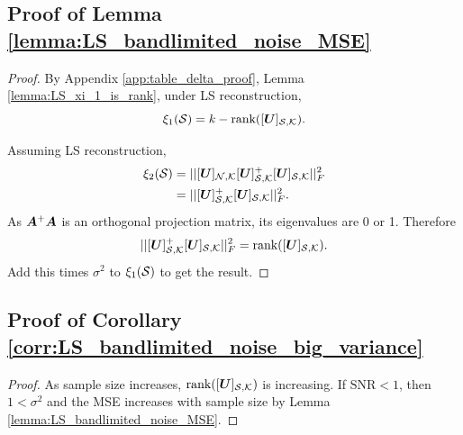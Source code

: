 \subsection{Proof of Lemma \ref{lemma:LS_bandlimited_noise_MSE}}
\begin{proof}
By Appendix \ref{app:table_delta_proof}, Lemma \ref{lemma:LS_xi_1_is_rank}, under LS reconstruction,
    \begin{equation}
    \xi_{1}(\mathcal{S}) = k - \textrm{rank}([\bm{U}]_{\mathcal{S},\mathcal{K}}).
    \end{equation}

    Assuming LS reconstruction,
    \begin{align}
         \xi_{2}(\set{S}) &=  || \matrsubU{N}[\matr{U}]_{\set{S},\set{K}}^{+}[\matr{U}]_{\set{S},\set{K}}||^{2}_{F} \\
         &= || [\matr{U}]_{\set{S},\set{K}}^{+}[\matr{U}]_{\set{S},\set{K}}||^{2}_{F}.
    \end{align}
    As $\bm{A}^{+}\bm{A}$ is an orthogonal projection matrix, its eigenvalues are 0 or 1. Therefore
    \begin{equation}
         || [\bm{U}]_{\mathcal{S},\mathcal{K}}^{+}[\bm{U}]_{\mathcal{S},\mathcal{K}}||^{2}_{F} =  \textrm{rank}([\bm{U}]_{\mathcal{S},\mathcal{K}}).
    \end{equation}
    Add this times $\sigma^{2}$ to $\xi_{1}(\mathcal{S})$ to get the result.
\end{proof}
\subsection{Proof of Corollary \ref{corr:LS_bandlimited_noise_big_variance}}
\begin{proof}
    As sample size increases, $\textrm{rank}([\bm{U}]_{\mathcal{S},\mathcal{K}})$ is increasing. If $\textrm{SNR} < 1$, then $1<\sigma^{2}$ and the MSE increases with sample size by Lemma \ref{lemma:LS_bandlimited_noise_MSE}.
\end{proof}
